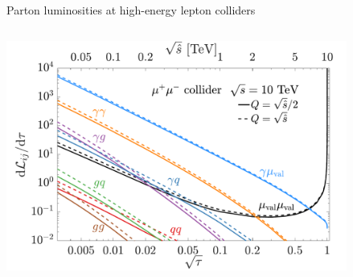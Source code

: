 \documentclass[aspectratio=169]{beamer}
\begin{document}
\begin{frame}{Parton luminosities at high-energy lepton colliders}
\begin{columns}
\begin{column}{0.44\textwidth}
			\includegraphics[width=0.84\textwidth]{figs/lumi_mu_10TeV}
		\end{column}
	\end{columns}
\end{frame}
\end{document}
